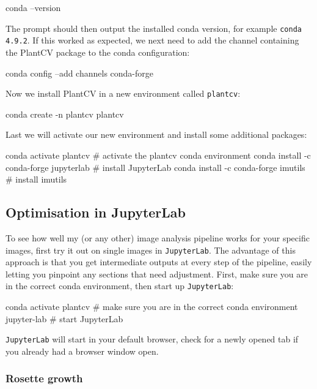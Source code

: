 \documentclass[10pt]{article}
\begin{document}
\begin{bashcode}
	conda --version
\end{bashcode}

The prompt should then output the installed conda version, for example \texttt{conda 4.9.2}. If this worked as expected, we next need to add the channel containing the PlantCV package to the conda configuration:

\begin{bashcode}
	conda config --add channels conda-forge
\end{bashcode}

Now we install PlantCV in a new environment called \texttt{plantcv}:

\begin{bashcode}
	conda create -n plantcv plantcv
\end{bashcode}

Last we will activate our new environment and install some additional packages:

\begin{bashcode}
	conda activate plantcv # activate the plantcv conda environment
	conda install -c conda-forge jupyterlab # install JupyterLab
	conda install -c conda-forge imutils # install imutils
\end{bashcode}

\subsection{Optimisation in JupyterLab\label{opt}}

To see how well my (or any other) image analysis pipeline works for your specific images, first try it out on single images in \texttt{JupyterLab}. The advantage of this approach is that you get intermediate outputs at every step of the pipeline, easily letting you pinpoint any sections that need adjustment. First, make sure you are in the correct conda environment, then start up \texttt{JupyterLab}:

\begin{bashcode}
	conda activate plantcv # make sure you are in the correct conda environment
	jupyter-lab # start JupyterLab
\end{bashcode}

\texttt{JupyterLab} will start in your default browser, check for a newly opened tab if you already had a browser window open.

\subsubsection{Rosette growth}
\end{document}
